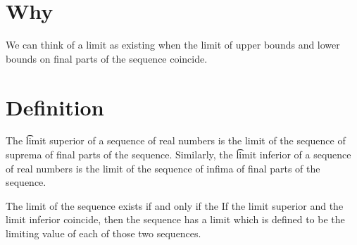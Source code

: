 

\section*{Why}

We can think of a limit as existing when the limit of upper bounds and lower bounds on final parts of the sequence coincide.

\section*{Definition}

The
\t{limit superior}
of a sequence of real numbers
is the limit of the sequence
of suprema of final parts
of the sequence.
Similarly, the
\t{limit inferior}
of a sequence of real numbers
is the limit of the sequence
of infima of final parts
of the sequence.

The limit of the sequence
exists if and only if the
If the limit superior and the
limit inferior coincide,
then the sequence has
a limit which is defined
to be the limiting value of
each of those two sequences.

\blankpage